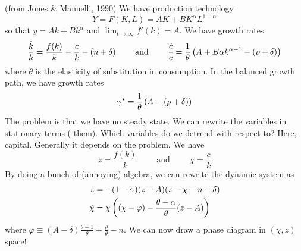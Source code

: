 \documentclass[10pt]{article}
\begin{document}
\begin{model}
	 (from \href{https://www.journals.uchicago.edu/doi/abs/10.1086/261717}{Jones \& Manuelli, 1990}) We have production technology\[Y = F(K,L) = AK + BK^\alpha L^{1-\alpha}\]so that $y = Ak + Bk^\alpha$ and $\lim_{t\to\infty} f'(k) = A$. We have growth rates\[\frac{\dot{k}}{k} = \frac{f(k)}{k} - \frac{c}{k} - (n + \delta) \qquad \text{ and } \qquad \frac{\dot{c}}{c} = \frac{1}{\theta} \left( A + B\alpha k^{\alpha-1}- (\rho + \delta)\right)\]where $\theta$ is the elasticity of substitution in consumption. In the balanced growth path, we have growth rates \[\gamma^\star = \frac{1}{\theta} \left( A - (\rho + \delta)\right)\]The problem is that we have no steady state. We can rewrite the variables in stationary terms (\ie {} them). Which variables do we detrend with respect to? Here, capital. Generally it depends on the problem. We have\[z = \frac{f(k)}{k} \qquad \text{ and } \qquad \chi = \frac{c}{k}\]By doing a bunch of (annoying) algebra, we can rewrite the dynamic system as\begin{align*} \dot{z} &= - (1-\alpha)(z-A)(z-\chi - n - \delta) \\ \dot{\chi} &= \chi \left( (\chi - \varphi) - \frac{\theta - \alpha}{\theta}(z-A)\right) \end{align*}where $\varphi \equiv (A-\delta)\frac{\theta-1}{\theta} + \frac{\rho}{\theta} - n$. We can now draw a phase diagram in $(\chi,z)$ space!
\end{model}
\end{document}
